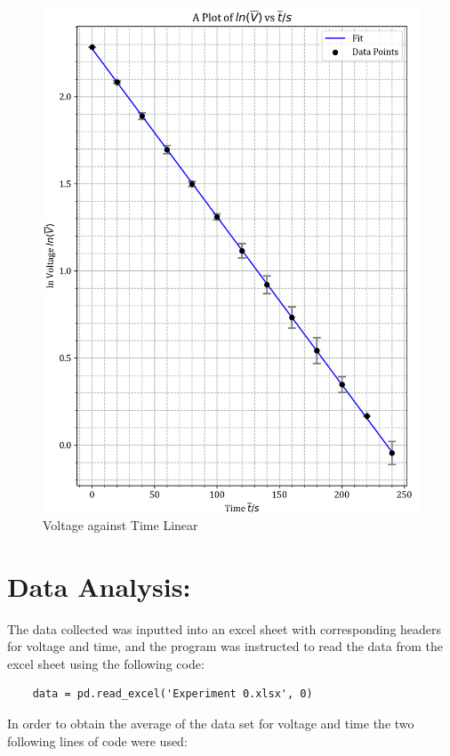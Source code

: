 \documentclass[12pt, a4paper]{article}
\begin{document}
\begin{figure}
    \centering
    \includegraphics[width=\textwidth]{Experiment0LinearPlot.png}
    \caption{Voltage against Time Linear}
    \label{fig:Linear Graph}
\end{figure}

\section*{Data Analysis:}
The data collected was inputted into an excel sheet with corresponding headers for voltage and time, and the program was instructed to read the data from the excel sheet using the following code:
\begin{verbatim}
    data = pd.read_excel('Experiment 0.xlsx', 0)    
\end{verbatim}
In order to obtain the average of the data set for voltage and time the two following lines of code were used:
\end{document}
